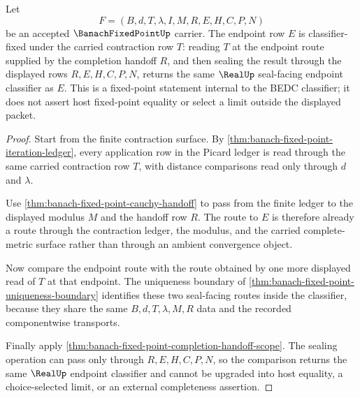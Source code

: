 \begin{theorem}
\label{thm:banach-fixed-point-endpoint-fixedness}
Let
$$
F=(B,d,T,\lambda,I,M,R,E,H,C,P,N)
$$
be an accepted $\BanachFixedPointUp$ carrier. The endpoint row $E$ is classifier-fixed under the carried contraction row $T$: reading $T$ at the endpoint route supplied by the completion handoff $R$, and then sealing the result through the displayed rows $R,E,H,C,P,N$, returns the same $\RealUp$ seal-facing endpoint classifier as $E$. This is a fixed-point statement internal to the BEDC classifier; it does not assert host fixed-point equality or select a limit outside the displayed packet.
\end{theorem}
\begin{proof}
Start from the finite contraction surface. By \autoref{thm:banach-fixed-point-iteration-ledger}, every application row in the Picard ledger is read through the same carried contraction row $T$, with distance comparisons read only through $d$ and $\lambda$.

Use \autoref{thm:banach-fixed-point-cauchy-handoff} to pass from the finite ledger to the displayed modulus $M$ and the handoff row $R$. The route to $E$ is therefore already a route through the contraction ledger, the modulus, and the carried complete-metric surface rather than through an ambient convergence object.

Now compare the endpoint route with the route obtained by one more displayed read of $T$ at that endpoint. The uniqueness boundary of \autoref{thm:banach-fixed-point-uniqueness-boundary} identifies these two seal-facing routes inside the classifier, because they share the same $B,d,T,\lambda,M,R$ data and the recorded componentwise transports.

Finally apply \autoref{thm:banach-fixed-point-completion-handoff-scope}. The sealing operation can pass only through $R,E,H,C,P,N$, so the comparison returns the same $\RealUp$ endpoint classifier and cannot be upgraded into host equality, a choice-selected limit, or an external completeness assertion.
\end{proof}

